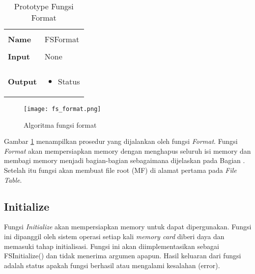 \documentclass[a4paper, 12pt]{report}
\begin{document}
\begin{table}[htbp]
  \centering
  \begin{tabular}{p{2cm}p{8cm}}
    \hline\\
    {\bf Name} & FSFormat\\
    \hline\\
    {\bf Input}  & None\\
    \hline\\
    {\bf Output} & 
    \begin{itemize}[noitemsep,topsep=0pt,parsep=0pt,partopsep=0pt]
    \item Status
    \end{itemize}
    \\
    \hline
  \end{tabular}
  \caption{Prototype Fungsi Format}
  \label{tbl-format}
\end{table}


\begin{figure}[h]
\centering
\texttt{[image: fs\_format.png]}
\caption{Algoritma fungsi format}
\label{fig-format}
\end{figure}

Gambar \ref{fig-format} menampilkan prosedur yang dijalankan oleh fungsi {\em Format}. Fungsi {\em Format} akan mempersiapkan memory dengan menghapus seluruh isi memory dan membagi memory menjadi bagian-bagian sebagaimana dijelaskan pada Bagian . Setelah itu fungsi akan membuat file root (MF) di alamat pertama pada {\em File Table}. 


\subsection{Initialize}

Fungsi {\em Initialize} akan mempersiapkan memory untuk dapat dipergunakan. Fungsi ini dipanggil oleh sistem operasi setiap kali \textsl{memory card} diberi daya dan memasuki tahap initialisasi. Fungsi ini akan diimplementasikan sebagai FSInitialize() dan tidak menerima argumen apapun. Hasil keluaran dari fungsi adalah status apakah fungsi berhasil atau mengalami kesalahan (error).
\end{document}
